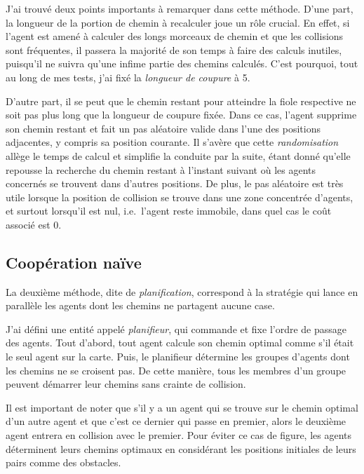 \documentclass[letterpaper]{article}
\begin{document}
J'ai trouv\'e deux points importants \`a remarquer dans cette m\'ethode.
D'une part, la longueur de la portion de chemin \`a recalculer joue un r\^ole crucial.
En effet, si l'agent est amen\'e \`a calculer des longs morceaux de chemin et que les collisions sont fr\'equentes, il passera la majorit\'e de son temps \`a faire des calculs inutiles, puisqu'il ne suivra qu'une infime partie des chemins calcul\'es.
C'est pourquoi, tout au long de mes tests, j'ai fix\'e la \textit{longueur de coupure} \`a 5.

D'autre part, il se peut que le chemin restant pour atteindre la fiole respective ne soit pas plus long que la longueur de coupure fix\'ee.
Dans ce cas, l'agent supprime son chemin restant et fait un pas al\'eatoire valide dans l'une des positions adjacentes, y compris sa position courante.
Il s'av\`ere que cette \textit{randomisation} all\`ege le temps de calcul et simplifie la conduite par la suite, \'etant donn\'e qu'elle repousse la recherche du chemin restant \`a l'instant suivant o\`u les agents concern\'es se trouvent dans d'autres positions.
De plus, le pas al\'eatoire est tr\`es utile lorsque la position de collision se trouve dans une zone concentr\'ee d'agents, et surtout lorsqu'il est nul, i.e.\ l'agent reste immobile, dans quel cas le co\^ut associ\'e est 0.

\subsection{Coop\'eration na\"ive}
La deuxi\`eme m\'ethode, dite de \textit{planification}, correspond \`a la strat\'egie qui lance en parall\`ele les agents dont les chemins ne partagent aucune case. 

J'ai d\'efini une entit\'e appel\'e \textit{planifieur}, qui commande et fixe l'ordre de passage des agents.
Tout d'abord, tout agent calcule son chemin optimal comme s'il \'etait le seul agent sur la carte.
Puis, le planifieur d\'etermine les groupes d'agents dont les chemins ne se croisent pas. De cette mani\`ere, tous les membres d'un groupe peuvent d\'emarrer leur chemins sans crainte de collision.

Il est important de noter que s'il y a un agent qui se trouve sur le chemin optimal d'un autre agent et que c'est ce dernier qui passe en premier, alors le deuxi\`eme agent entrera en collision avec le premier.
Pour \'eviter ce cas de figure, les agents d\'eterminent leurs chemins optimaux en consid\'erant les positions initiales de leurs pairs comme des obstacles.
\end{document}
